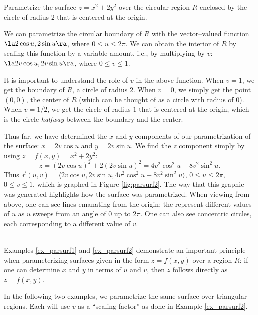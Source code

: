 {Parametrize the surface $z=x^2+2y^2$ over the circular region $R$ enclosed by the circle of radius 2 that is centered at the origin.
}
{We can parametrize the circular boundary of $R$ with the vector--valued function $\la 2\cos u,2\sin u\ra$, where $0\leq u\leq 2\pi$. We can obtain the interior of $R$ by scaling this function by a variable amount, i.e., by multiplying by $v$: $\la 2v\cos u,2v\sin u\ra$, where $0\leq v\leq 1$. 

It is important to understand the role of $v$ in the above function. When $v=1$, we get the boundary of $R$, a circle of radius 2. When $v=0$, we simply get the point $(0,0)$, the center of $R$ (which can be thought of as a circle with radius of 0). When $v=1/2$, we get the circle of radius $1$ that is centered at the origin, which is the circle \emph{halfway} between the boundary and the center.


Thus far, we have determined the $x$ and $y$ components of our parametrization of the surface: $x=2v\cos u$ and $y=2v\sin u$. We find the $z$ component simply by using $z = f(x,y) = x^2+2y^2$: 
$$z = (2v\cos u)^2+2(2v\sin u)^2 = 4v^2\cos^2u+8v^2\sin^2u.$$
Thus $\vec r(u,v) = \langle 2v\cos u,2v\sin u,4v^2\cos^2u+8v^2\sin^2u\rangle$, $0\leq u\leq 2\pi$, $0\leq v\leq 1$, which is graphed in Figure \ref{fig:parsurf2}. The way that this graphic was generated highlights how the surface was parametrized. When viewing from above, one can see lines emanating from the origin; the represent different values of $u$ as $u$ sweeps from an angle of 0 up to $2\pi$. One can also see concentric circles, each corresponding to a different value of $v$. 
}\\

Examples \ref{ex_parsurf1} and \ref{ex_parsurf2} demonstrate an important principle when parameterizing surfaces given in the form $z=f(x,y)$ over a region $R$: if one can determine $x$ and $y$ in terms of $u$ and $v$, then $z$ follows directly as $z=f(x,y)$. 

In the following two examples, we parametrize the same surface over triangular regions. Each will use $v$ as a ``scaling factor'' as done in Example \ref{ex_parsurf2}.\\

